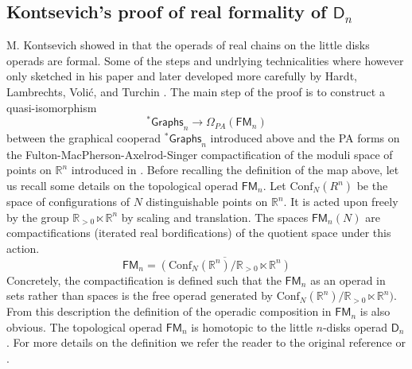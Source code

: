 \documentclass[a4paper]{amsart}
\theoremstyle{plain}
\theoremstyle{definition}
\newcommand{\R}{{\mathbb{R}}}
\newcommand{\Graphs}{{\mathsf{Graphs}}}
\newcommand{\FM}{\mathsf{FM}}
\newcommand{\stG}{{}^*\Graphs}
\newcommand{\lD}{\mathsf{D}}
\newcommand{\Conf}{\mathrm{Conf}}
\begin{document}
\subsection{Kontsevich's proof of real formality of \texorpdfstring{$\lD_n$}{Dn}}
M. Kontsevich showed in \cite{K2} that the operads of real chains on the little disks operads are formal.
Some of the steps and undrlying technicalities where however only sketched in his paper and later developed more carefully by Hardt, Lambrechts, Voli\'c, and Turchin \cite{LV,HLTV}. 
The main step of the proof is to construct a quasi-isomorphism 
\begin{equation}\label{equ:Kmap}
 \stG_n \to \Omega_{PA}(\FM_n)
\end{equation}
between the graphical cooperad $\stG_n$ introduced above and the PA forms \cite{HLTV} on the Fulton-MacPherson-Axelrod-Singer compactification of the moduli space of points on $\R^n$ introduced in \cite{GJ}.
Before recalling the definition of the map above, let us recall some details on the topological operad $\FM_n$.
Let $\Conf_{N}(R^n)$ be the space of configurations of $N$ distinguishable points on $\R^n$. It is acted upon freely by the group $\R_{>0}\ltimes \R^n$ by scaling and translation.
The spaces $\FM_n(N)$ are compactifications (iterated real bordifications) of the quotient space under this action.
\[
 \FM_n = \overline{ (\Conf_N(\R^n)/\R_{>0}\ltimes \R^n)}
\]
Concretely, the compactification is defined such that the $\FM_n$ as an operad in sets rather than spaces is the free operad generated by $\Conf_N(\R^n)/\R_{>0}\ltimes \R^n)$. From this description the definition of the operadic composition in $\FM_n$ is also obvious. The topological operad $\FM_n$ is homotopic to the little $n$-disks operad $\lD_n$.
For more details on the definition we refer the reader to the original reference \cite{GJ} or \cite{Si}.
\end{document}
